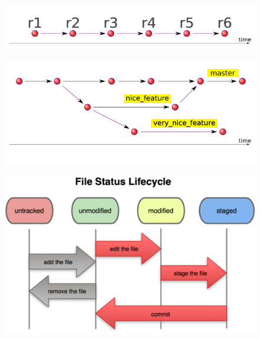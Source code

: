 \documentclass{beamer}
\begin{document}
\begin{frame}
  \begin{figure}
   \includegraphics[width=1.0\textwidth]{./images/svn-timeline.png}
  \end{figure}

  \begin{figure}
   \includegraphics[width=1.0\textwidth]{./images/git-timeline.png}
  \end{figure}
\end{frame}

\begin{frame}
 \begin{figure}
  \includegraphics[width=1.0\textwidth]{./images/file-status-lifecycle.png}
 \end{figure}

\end{frame}
\end{document}
